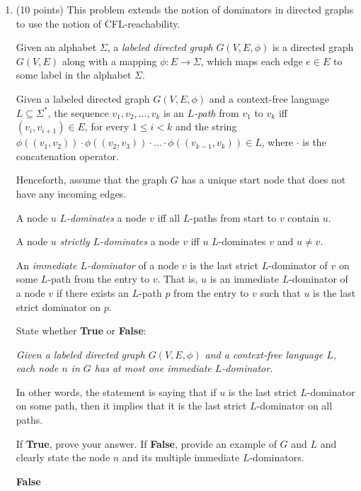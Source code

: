 \documentclass[12pt]{article}
\begin{document}
\begin{enumerate}
      \clearpage
      \item (10 points) This problem extends the notion of dominators in
      directed graphs to use the notion of CFL-reachability.

      Given an alphabet $\Sigma$, a \emph{labeled directed graph} $G(V, E, \phi)$ is a
      directed graph $G(V, E)$  along with a mapping $\phi \colon E \to \Sigma$,
      which maps each edge $e\in E$ to some label in the alphabet $\Sigma$. 

      Given a labeled directed graph $G(V, E, \phi)$ and a context-free language
      $L \subseteq \Sigma^*$, the sequence $v_1, v_2, \ldots, v_k$ is an
      \emph{$L$-path} from $v_1$ to $v_k$ iff $(v_i,v_{i+1}) \in E$, for every
      $1\leq i < k$ and the string $\phi((v_1, v_2)) \cdot \phi((v_2, v_3)) \cdot \ldots \cdot
      \phi((v_{k-1},v_k)) \in L$, where $\cdot$ is the concatenation operator. 

      Henceforth, assume that the graph $G$ has a unique start node that does
      not have any incoming edges. 

      A node $u$ \emph{$L$-dominates} a node $v$ iff all $L$-paths from start to 
      $v$ contain $u$. 

      A node $u$ \emph{strictly $L$-dominates} a node $v$ iff $u$ $L$-dominates $v$ 
      and $u \neq v$. 

      An \emph{immediate $L$-dominator} of a node $v$ is the last strict
      $L$-dominator of $v$ on some $L$-path from the entry to $v$. That is, $u$
      is an immediate $L$-dominator of a node $v$ if there exists an $L$-path
      $p$ from the entry to $v$ such that $u$ is the last strict dominator on
      $p$.

      State whether \textbf{True} or \textbf{False}: 
    
      \emph{Given a labeled directed graph $G(V,E, \phi)$ and a context-free
      language $L$, each node $n$ in $G$ has at most one immediate $L$-dominator.}

      In other words, the statement is saying that if $u$ is the last strict
      $L$-dominator on some path, then it implies that it is the last strict
      $L$-dominator on all paths. 
    
      If \textbf{True}, prove your answer. If \textbf{False}, provide an example
      of $G$ and $L$ and clearly state the node $n$ and its multiple immediate
      $L$-dominators.
      \begin{mdframed}
      \textbf{False} %


\end{mdframed}
\end{enumerate}
\end{document}
